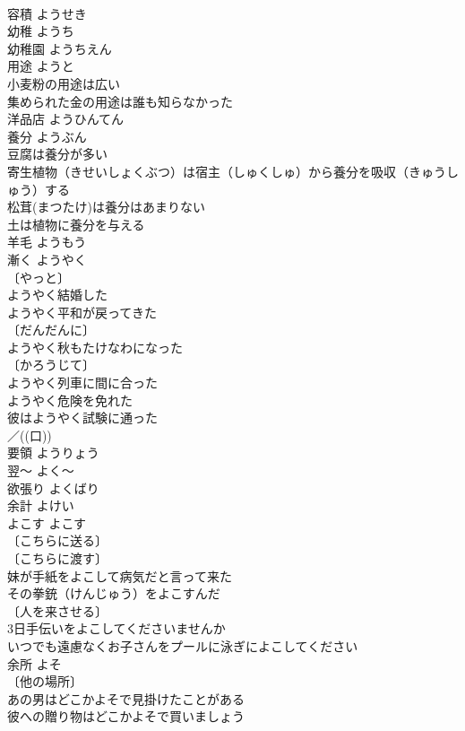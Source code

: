 \documentclass[8pt]{extreport}
\begin{document}
\begin{CJK}{UTF8}{min}
\\	容積	ようせき	
\\	幼稚	ようち	
\\	幼稚園	ようちえん	
\\	用途	ようと	
\\	小麦粉の用途は広い 
\\	集められた金の用途は誰も知らなかった 
\\	洋品店	ようひんてん	
\\	養分	ようぶん	
\\	豆腐は養分が多い 
\\	寄生植物（きせいしょくぶつ）は宿主（しゅくしゅ）から養分を吸収（きゅうしゅう）する 
\\	松茸(まつたけ)は養分はあまりない 
\\	土は植物に養分を与える 
\\	羊毛	ようもう	
\\	漸く	ようやく	
\\	〔やっと〕
\\	ようやく結婚した 
\\	ようやく平和が戻ってきた 
\\	〔だんだんに〕
\\	ようやく秋もたけなわになった 
\\	〔かろうじて〕
\\	ようやく列車に間に合った 
\\	ようやく危険を免れた 
\\	彼はようやく試験に通った 
\\	／((口)) 
\\	要領	ようりょう	
\\	翌～	よく～	
\\	欲張り	よくばり	
\\	余計	よけい	
\\	よこす	よこす	
\\	〔こちらに送る〕
\\	〔こちらに渡す〕
\\	妹が手紙をよこして病気だと言って来た 
\\	その拳銃（けんじゅう）をよこすんだ 
\\	〔人を来させる〕 
\\	3日手伝いをよこしてくださいませんか 
\\	いつでも遠慮なくお子さんをプールに泳ぎによこしてください 
\\	余所	よそ	
\\	〔他の場所〕
\\	あの男はどこかよそで見掛けたことがある 
\\	彼への贈り物はどこかよそで買いましょう 

\end{CJK}
\end{document}
